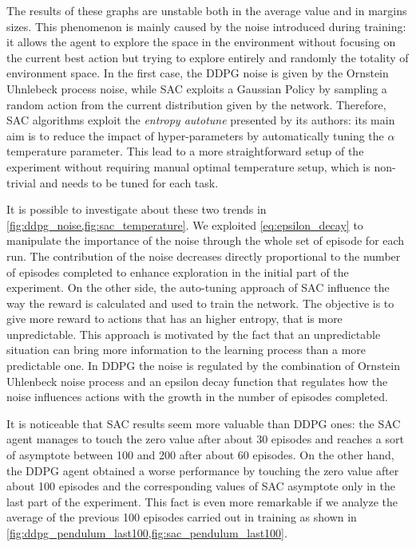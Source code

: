 The results of these graphs are unstable both in the average value and in margins sizes.
This phenomenon is mainly caused by the noise introduced during training: it allows the agent to explore the space in the environment without focusing on the current best action but trying to explore entirely and randomly the totality of environment space.
In the first case, the DDPG noise is given by the Ornstein Uhnlebeck process noise, while SAC exploits a Gaussian Policy by sampling a random action from the current distribution given by the network.
Therefore, SAC algorithms exploit the \textit{entropy autotune} presented by its authors: its main aim is to reduce the impact of hyper-parameters by automatically tuning the $\alpha$ temperature parameter.
This lead to a more straightforward setup of the experiment without requiring manual optimal temperature setup, which is non-trivial and needs to be tuned for each task.

It is possible to investigate about these two trends in \vref{fig:ddpg_noise,fig:sac_temperature}.
We exploited \vref{eq:epsilon_decay} to manipulate the importance of the noise through the whole set of episode for each run.
The contribution of the noise decreases directly proportional to the number of episodes completed to enhance exploration in the initial part of the experiment.
On the other side, the auto-tuning approach of SAC influence the way the reward is calculated and used to train the network. The objective is to give more reward to actions that has an higher entropy, that is more unpredictable. This approach is motivated by the fact that an unpredictable situation can bring more information to the learning process than a more predictable one.
In DDPG the noise is regulated by the combination of Ornstein Uhlenbeck noise process and an epsilon decay function that regulates how the noise influences actions with the growth in the number of episodes completed.

It is noticeable that SAC results seem more valuable than DDPG ones: the SAC agent manages to touch the zero value after about 30 episodes and reaches a sort of asymptote between 100 and 200 after about 60 episodes.
On the other hand, the DDPG agent obtained a worse performance by touching the zero value after about 100 episodes and the corresponding values of SAC asymptote only in the last part of the experiment.
This fact is even more remarkable if we analyze the average of the previous 100 episodes carried out in training as shown in \vref{fig:ddpg_pendulum_last100,fig:sac_pendulum_last100}.

